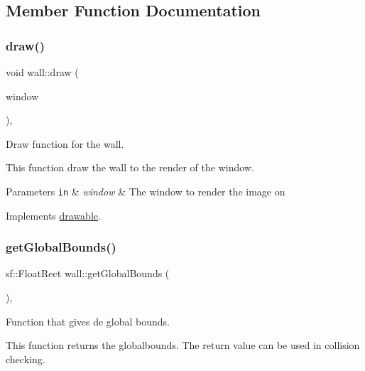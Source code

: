 \subsection{Member Function Documentation}
\mbox{\label{classwall_aa25b8377e1d9a209fabd2271294f05d0}} 
\subsubsection{\texorpdfstring{draw()}{draw()}}
{\footnotesize\ttfamily void wall\+::draw (\begin{DoxyParamCaption}\item[{sf\+::\+Render\+Window \&}]{window }\end{DoxyParamCaption})\hspace{0.3cm}{\ttfamily [override]}, {\ttfamily [virtual]}}



Draw function for the wall. 

This function draw the wall to the render of the window.


\begin{DoxyParams}[1]{Parameters}
\mbox{\tt in}  & {\em window} & The window to render the image on \\
\hline
\end{DoxyParams}


Implements \hyperlink{classdrawable_a4e49e2c1121704c83ce24c5f48dd910f}{drawable}.

\mbox{\label{classwall_a317a464c879cfdf9464bd6f1b62d9101}} 
\subsubsection{\texorpdfstring{get\+Global\+Bounds()}{getGlobalBounds()}}
{\footnotesize\ttfamily sf\+::\+Float\+Rect wall\+::get\+Global\+Bounds (\begin{DoxyParamCaption}{ }\end{DoxyParamCaption})\hspace{0.3cm}{\ttfamily [override]}, {\ttfamily [virtual]}}



Function that gives de global bounds. 

This function returns the globalbounds. The return value can be used in collision checking.

